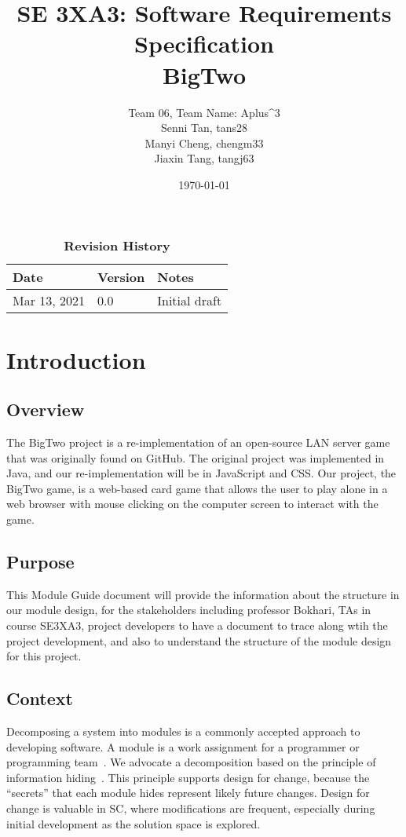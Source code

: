 \documentclass[12pt, titlepage]{article}
\title{SE 3XA3: Software Requirements Specification\\BigTwo}
\author{Team 06, Team Name: Aplus^3
		\\ Senni Tan, tans28
		\\ Manyi Cheng, chengm33
		\\ Jiaxin Tang, tangj63
}
\date{\today}
\begin{document}
\maketitle

\tableofcontents
\listoftables
\listoffigures

\begin{table}[bp]
\caption{\bf Revision History}
\begin{tabularx}{\textwidth}{p{3cm}p{2cm}X}
\toprule {\bf Date} & {\bf Version} & {\bf Notes}\\
\midrule
Mar 13, 2021 & 0.0 & Initial draft\\
\bottomrule
\end{tabularx}
\end{table}

\newpage


\section{Introduction}
\subsection{Overview}
The BigTwo project is a re-implementation of an open-source LAN server game that was originally found on GitHub. The original project was implemented in Java, and our re-implementation will be in JavaScript and CSS. Our project, the BigTwo game, is a web-based card game that allows the user to play alone in a web browser with mouse clicking on the computer screen to interact with the game.

\subsection{Purpose}
This Module Guide document will provide the information about the structure in our module design, for the stakeholders including professor Bokhari, TAs in course SE3XA3, project developers to have a document to trace along wtih the project development, and also to understand the structure of the module design for this project.

\subsection{Context}
Decomposing a system into modules is a commonly accepted approach to developing
software.  A module is a work assignment for a programmer or programming
team~\citep{ParnasEtAl1984}.  We advocate a decomposition
based on the principle of information hiding~\citep{Parnas1972a}.  This
principle supports design for change, because the ``secrets'' that each module
hides represent likely future changes.  Design for change is valuable in SC,
where modifications are frequent, especially during initial development as the
solution space is explored.  
\end{document}

